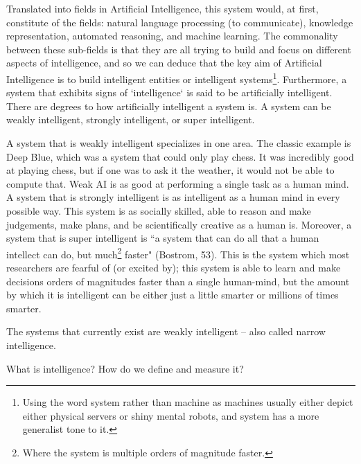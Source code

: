 \documentclass[11pt]{article}
\begin{document}
\par Translated into fields in Artificial Intelligence, this system would, at first, constitute of the fields: natural language processing (to communicate), knowledge representation, automated reasoning, and machine learning. The commonality between these sub-fields is that they are all trying to build and focus on different aspects of intelligence, and so we can deduce that the key aim of Artificial Intelligence is to build intelligent entities or intelligent systems\footnote{Using the word system rather than machine as machines usually either depict either physical servers or shiny mental robots, and system has a more generalist tone to it.}. Furthermore, a system that exhibits signs of `intelligence` is said to be artificially intelligent. There are degrees to how artificially intelligent a system is. A system can be weakly intelligent, strongly intelligent, or super intelligent. 

\par A system that is weakly intelligent specializes in one area. The classic example is Deep Blue, which was a system that could only play chess. It was incredibly good at playing chess, but if one was to ask it the weather, it would not be able to compute that. Weak AI is as good at performing a single task as a human mind. A system that is strongly intelligent is as intelligent as a human mind in every possible way. This system is as socially skilled, able to reason and make judgements, make plans, and be scientifically creative as a human is. Moreover, a system that is super intelligent is ``a system that can do all that a human intellect can do, but much\footnote{Where the system is multiple orders of magnitude faster.} faster" (Bostrom, 53). This is the system which most researchers are fearful of (or excited by); this system is able to learn and make decisions orders of magnitudes faster than a single human-mind, but the amount by which it is intelligent can be either just a little smarter or millions of times smarter.

\par The systems that currently exist are weakly intelligent -- also called narrow intelligence. 
\newline

\begin{center}
	{\large What is intelligence? How do we define and measure it?\par}
\end{center}
\end{document}
